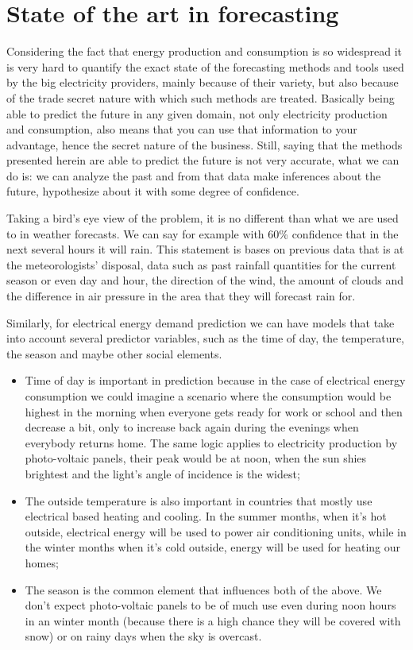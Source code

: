 \documentclass[12pt,a4paper,titlepage]{report}
\begin{document}
\section{State of the art in forecasting}

Considering the fact that energy production and consumption is so widespread it is very hard to quantify the exact state of the forecasting methods and tools used by the big electricity providers, mainly because of their variety, but also because of the trade secret nature with which such methods are treated. Basically being able to predict the future in any given domain, not only electricity production and consumption, also means that you can use that information to your advantage, hence the secret nature of the business. Still, saying that the methods presented herein are able to predict the future is not very accurate, what we can do is: we can analyze the past and from that data make inferences about the future, hypothesize about it with some degree of confidence.

Taking a bird's eye view of the problem, it is no different than what we are used to in weather forecasts. We can say for example with 60\% confidence that in the next several hours it will rain. This statement is bases on previous data that is at the meteorologists' disposal, data such as past rainfall quantities for the current season or even day and hour, the direction of the wind, the amount of clouds and the difference in air pressure in the area that they will forecast rain for.

Similarly, for electrical energy demand prediction we can have models that take into account several predictor variables, such as the time of day, the temperature, the season and maybe other social elements.
\begin{itemize}
    \item Time of day is important in prediction because in the case of electrical energy consumption we could imagine a scenario where the consumption would be highest in the morning when everyone gets ready for work or school and then decrease a bit, only to increase back again during the evenings when everybody returns home. The same logic applies to electricity production by photo-voltaic panels, their peak would be at noon, when the sun shies brightest and the light's angle of incidence is the widest;
    \item The outside temperature is also important in countries that mostly use electrical based heating and cooling. In the summer months, when it's hot outside, electrical energy will be used to power air conditioning units, while in the winter months when it's cold outside, energy will be used for heating our homes;
    \item The season is the common element that influences both of the above. We don't expect photo-voltaic panels to be of much use even during noon hours in an winter month (because there is a high chance they will be covered with snow) or on rainy days when the sky is overcast.
\end{itemize}
\end{document}

